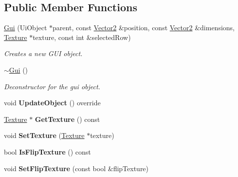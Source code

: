 \subsection*{Public Member Functions}
\begin{DoxyCompactItemize}
\item 
\hyperlink{class_flounder_1_1_gui_a4936932de3c650580ec6846958ab12d0}{Gui} (Ui\+Object $\ast$parent, const \hyperlink{class_flounder_1_1_vector2}{Vector2} \&position, const \hyperlink{class_flounder_1_1_vector2}{Vector2} \&dimensions, \hyperlink{class_flounder_1_1_texture}{Texture} $\ast$texture, const int \&selected\+Row)
\begin{DoxyCompactList}\small\item\em Creates a new G\+UI object. \end{DoxyCompactList}\item 
\hyperlink{class_flounder_1_1_gui_ad0702f8f8fec510facec865b51b02164}{$\sim$\+Gui} ()
\begin{DoxyCompactList}\small\item\em Deconstructor for the gui object. \end{DoxyCompactList}\item 
\mbox{\label{class_flounder_1_1_gui_a77d8153229bea18f5de3a66139512d67}} 
void {\bfseries Update\+Object} () override
\item 
\mbox{\label{class_flounder_1_1_gui_a6a81bd8c9f0c8fec08838958221cac5c}} 
\hyperlink{class_flounder_1_1_texture}{Texture} $\ast$ {\bfseries Get\+Texture} () const
\item 
\mbox{\label{class_flounder_1_1_gui_a08d157cde912a072e14e3ff0e4af9d8b}} 
void {\bfseries Set\+Texture} (\hyperlink{class_flounder_1_1_texture}{Texture} $\ast$texture)
\item 
\mbox{\label{class_flounder_1_1_gui_a96194fa11383bfbcff608024db83ac4f}} 
bool {\bfseries Is\+Flip\+Texture} () const
\item 
\mbox{\label{class_flounder_1_1_gui_a40a50bf390055fd16b806f20a2c94b54}} 
void {\bfseries Set\+Flip\+Texture} (const bool \&flip\+Texture)
\item 
\mbox{\label{class_flounder_1_1_gui_a4506bedfe1359054271a1d260bb3fd94}} 

\end{DoxyCompactItemize}
